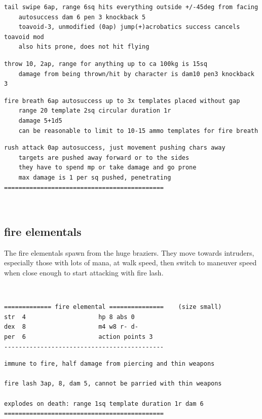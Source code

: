 \begin{samepage}
\begin{verbatim}
\end{verbatim} \goodbreak \begin{verbatim}
tail swipe 6ap, range 6sq hits everything outside +/-45deg from facing
    autosuccess dam 6 pen 3 knockback 5
    toavoid-3, unmodified (0ap) jump(+)acrobatics success cancels toavoid mod
    also hits prone, does not hit flying

\end{verbatim} \goodbreak \begin{verbatim}
throw 10, 2ap, range for anything up to ca 100kg is 15sq
    damage from being thrown/hit by character is dam10 pen3 knockback 3

\end{verbatim} \goodbreak \begin{verbatim}
fire breath 6ap autosuccess up to 3x templates placed without gap
    range 20 template 2sq circular duration 1r
    damage 5+1d5
    can be reasonable to limit to 10-15 ammo templates for fire breath

\end{verbatim} \goodbreak \begin{verbatim}
rush attack 0ap autosuccess, just movement pushing chars away
    targets are pushed away forward or to the sides
    they have to spend mp or take damage and go prone
    max damage is 1 per sq pushed, penetrating
============================================
\end{verbatim} \end{samepage} \normalsize

\


\goodbreak 
\subsection*{fire elementals}

The fire elementals spawn from the huge braziers. They move towards intruders, especially those with lots of mana, at walk speed, then switch to maneuver speed when close enough to start attacking with fire lash.

\

\small \begin{samepage} \begin{verbatim}
============= fire elemental ===============    (size small)
str  4                    hp 8 abs 0
dex  8                    m4 w8 r- d-
per  6                    action points 3
--------------------------------------------
\end{verbatim} \goodbreak \begin{verbatim}
immune to fire, half damage from piercing and thin weapons

fire lash 3ap, 8, dam 5, cannot be parried with thin weapons

explodes on death: range 1sq template duration 1r dam 6
============================================
\end{verbatim} \end{samepage} \normalsize


